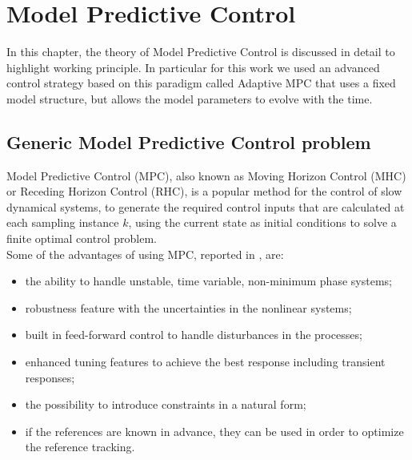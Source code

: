 \chapter{Model Predictive Control}

In this chapter, the theory of Model Predictive Control is discussed in detail to highlight working principle. In particular for this work we used an advanced control strategy based on this paradigm called Adaptive MPC that uses a fixed model structure, but allows the model parameters to evolve with the time.

\section{Generic Model Predictive Control problem}
Model Predictive Control (MPC), also known as Moving Horizon Control (MHC) or Receding Horizon Control (RHC), is a popular method for the control of slow dynamical systems, to generate the required
control inputs that are calculated at each sampling instance $k$, using the current state as initial
conditions to solve a finite optimal control problem.\\
Some of the advantages of using MPC, reported in \cite{camacho2004}, are:
\begin{itemize}
\item the ability to handle unstable, time variable, non-minimum phase systems;
\item robustness feature with the uncertainties in the nonlinear systems;
\item built in feed-forward control to handle disturbances in the processes;
\item enhanced tuning features to achieve the best response including transient responses;
\item the possibility to introduce constraints in a natural form;
\item if the references are known in advance, they can be used in order to optimize the reference tracking.
\end{itemize}


